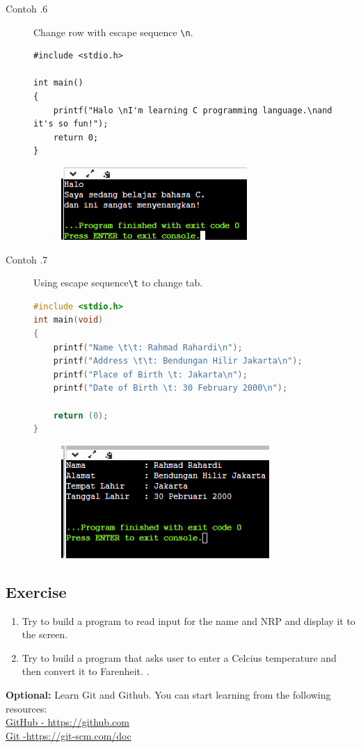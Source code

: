 \begin{description}
	\item[Contoh \thesubsection.6] Change row with escape sequence \verb*|\n|.
	\begin{lstlisting}
#include <stdio.h>

int main() 
{
	printf("Halo \nI'm learning C programming language.\nand it's so fun!");
	return 0;
}
	\end{lstlisting}
\begin{figure}[H]
	\centering
	\includegraphics[width=0.5\linewidth]{../P1/img/screenshot0006.png}
	\caption{}
	\label{fig:screenshot0006}
\end{figure}

\item[Contoh \thesubsection.7] Using escape sequence\verb*|\t| to change tab.
\begin{lstlisting}[language=c]
#include <stdio.h>
int main(void)
{
	printf("Name \t\t: Rahmad Rahardi\n");
	printf("Address \t\t: Bendungan Hilir Jakarta\n");
	printf("Place of Birth \t: Jakarta\n");
	printf("Date of Birth \t: 30 February 2000\n");
	
	return (0);
}
\end{lstlisting}
\begin{figure}[H]
	\centering
	\includegraphics[width=0.5\linewidth]{../P1/img/screenshot0007.png}
	\caption{}
	\label{fig:screenshot0007}
\end{figure}
\end{description}

\subsection{Exercise}
\begin{enumerate}
	\item Try to build a program to read input for the name and NRP and display it to the screen.
	\item Try to build a program that asks user to enter a Celcius temperature and then convert it to Farenheit.  .
\end{enumerate}

\begin{center}
    \colorbox{cyan!30}{\parbox{0.8\linewidth}{\textbf{Optional:} Learn Git and Github. You can start learning from the following resources: \\ \href{https://github.com}{GitHub - https://github.com} \\ \href{https://git-scm.com/doc}{Git -https://git-scm.com/doc}}}
\end{center}